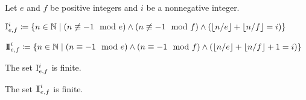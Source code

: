 %



\section{}

Let $e$ and $f$ be positive integers
and $i$ be a nonnegative integer.

\begin{definition}
\label{def:setI}
\leanok
$
\mathrm{I}_{e,f}^i
\coloneqq
\{
n \in \mathbb{N}
\mid
(n \not \equiv - 1 \mod e)
\wedge
(n \not \equiv - 1 \mod f)
\wedge
(\lfloor n / e \rfloor + \lfloor n / f \rfloor = i)
\}
$
\end{definition}

\begin{definition}
\label{def:setII}
$
\mathrm{I\!I}_{e,f}^i
\coloneqq
\{
n \in \mathbb{N}
\mid
(n \equiv - 1 \mod e)
\wedge
(n \equiv - 1 \mod f)
\wedge
(\lfloor n / e \rfloor + \lfloor n / f \rfloor + 1 = i)
\}
$
\end{definition}

\begin{lemma}
\label{lem:setI_finite}
The set $\mathrm{I}_{e,f}^i$ is finite.
\end{lemma}

\begin{lemma}
\label{lem:setII_finite}
The set $\mathrm{I\!I}_{e,f}^i$ is finite.
\end{lemma}

